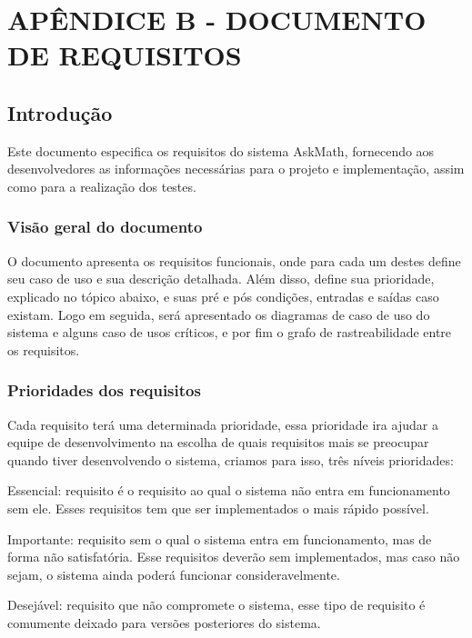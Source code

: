 \chapter*{APÊNDICE B - DOCUMENTO DE REQUISITOS}\label{apendice_requisitos}


\section{Introdução}
Este documento especifica os requisitos do sistema AskMath, fornecendo aos desenvolvedores as informações necessárias para o projeto e implementação, assim como para a realização dos testes. 

\subsection{Visão geral do documento}
O documento apresenta os requisitos funcionais, onde para cada um destes define seu caso de uso e sua descrição detalhada. Além disso, define sua prioridade, explicado no tópico abaixo, e suas pré e pós condições, entradas e saídas caso existam. Logo em seguida, será apresentado os diagramas de caso de uso do sistema e alguns caso de usos críticos, e por fim o grafo de rastreabilidade entre os requisitos.

\subsection{Prioridades dos requisitos}
Cada requisito terá uma determinada prioridade, essa prioridade ira ajudar a equipe de desenvolvimento na escolha de quais requisitos mais se preocupar quando tiver desenvolvendo o sistema, criamos para isso, três níveis prioridades:

\begin{alineascomponto}
	\item Essencial: requisito é o requisito ao qual o sistema não entra em funcionamento sem ele. Esses requisitos tem que ser implementados o mais rápido possível. 
    \item Importante: requisito sem o qual o sistema entra em funcionamento, mas de forma não satisfatória. Esse requisitos deverão sem implementados, mas caso não sejam, o sistema ainda poderá funcionar consideravelmente.
	\item Desejável: requisito que não compromete o sistema, esse tipo de requisito é comumente deixado para versões posteriores do sistema.
\end{alineascomponto}

